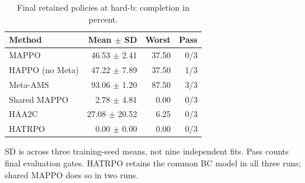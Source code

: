 \begin{table}[t]
\centering
\caption{Final retained policies at hard-b: completion in percent.}
\label{tab:hardb}
\small
\setlength{\tabcolsep}{4pt}
\begin{tabular}{lrrr}
\toprule
Method & Mean $\pm$ SD & Worst & Pass \\
\midrule
MAPPO & 46.53 $\pm$ 2.41 & 37.50 & 0/3 \\
HAPPO (no Meta) & 47.22 $\pm$ 7.89 & 37.50 & 1/3 \\
Meta-AMS & 93.06 $\pm$ 1.20 & 87.50 & 3/3 \\
Shared MAPPO & 2.78 $\pm$ 4.81 & 0.00 & 0/3 \\
HAA2C & 27.08 $\pm$ 20.52 & 6.25 & 0/3 \\
HATRPO & 0.00 $\pm$ 0.00 & 0.00 & 0/3 \\
\bottomrule
\end{tabular}

\vspace{2pt}\begin{minipage}{\linewidth}\footnotesize SD is across three training-seed means, not nine independent fits. Pass counts final evaluation gates. HATRPO retains the common BC model in all three runs; shared MAPPO does so in two runs.\end{minipage}
\end{table}
